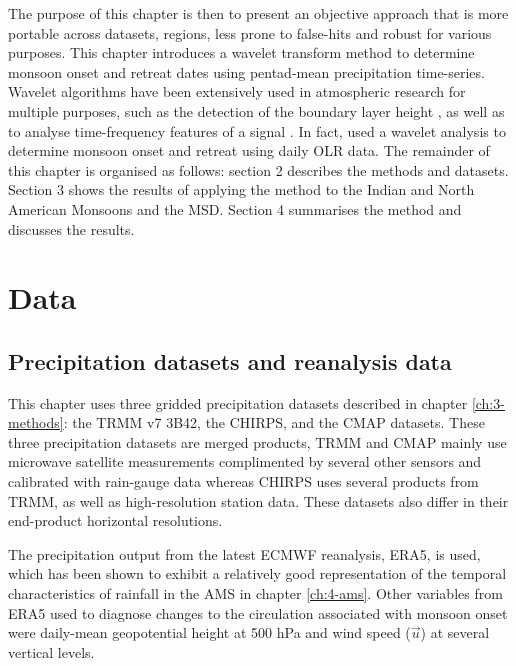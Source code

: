   The purpose of this chapter is then to present an objective approach that is more portable across datasets, regions, less prone to false-hits and robust for various purposes.
This chapter introduces a wavelet transform method to determine monsoon onset and retreat dates using pentad-mean precipitation time-series.  Wavelet algorithms have been extensively used in atmospheric research for multiple purposes, such as the detection of the boundary layer height \citep[e.g.][]{brooks2003}, as well as to analyse time-frequency features of a signal \citep[e.g.][]{whitcher2000,dimdore2021}. In fact, \cite{allen2017} used a wavelet analysis to determine monsoon onset and retreat using daily OLR data. The remainder of this chapter is organised as follows: section 2 describes the methods and datasets. Section 3 shows the results of applying the method to the Indian and North American Monsoons and the MSD. Section 4 summarises the method and discusses the results.



\section{Data}

\subsection{Precipitation datasets and reanalysis data}

This chapter uses three gridded precipitation datasets described in chapter \ref{ch:3-methods}: the TRMM v7 3B42, the CHIRPS, and the CMAP datasets.
These three precipitation datasets are merged products, TRMM and CMAP mainly use microwave satellite measurements complimented by several other sensors and calibrated with rain-gauge data whereas CHIRPS uses several products from TRMM, as well as high-resolution station data. These datasets also differ in their end-product horizontal resolutions.

The precipitation output from the latest ECMWF reanalysis, ERA5, is used, which has been shown to exhibit a relatively good representation of the temporal characteristics of rainfall in the AMS in chapter \ref{ch:4-ams}. 
Other variables from ERA5 used to diagnose changes to the circulation associated with monsoon onset were daily-mean geopotential height at 500 hPa and wind speed ($\vec{u}$) at several vertical levels. 

